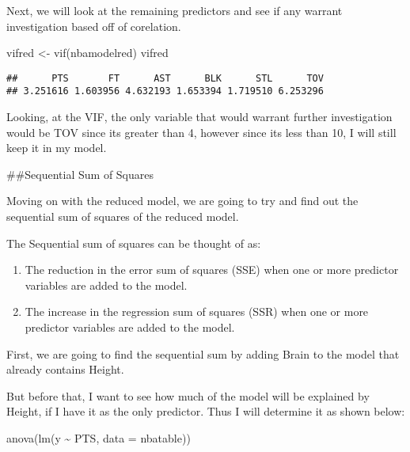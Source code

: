 \documentclass[
]{article}
\newenvironment{Shaded}{\begin{snugshade}}{\end{snugshade}}
\newcommand{\AttributeTok}[1]{\textcolor[rgb]{0.77,0.63,0.00}{#1}}
\newcommand{\FunctionTok}[1]{\textcolor[rgb]{0.00,0.00,0.00}{#1}}
\newcommand{\NormalTok}[1]{#1}
\newcommand{\OtherTok}[1]{\textcolor[rgb]{0.56,0.35,0.01}{#1}}
\newcommand{\SpecialCharTok}[1]{\textcolor[rgb]{0.00,0.00,0.00}{#1}}
\begin{document}
Next, we will look at the remaining predictors and see if any warrant
investigation based off of corelation.

\begin{Shaded}
\begin{Highlighting}[]
\NormalTok{vifred }\OtherTok{\textless{}{-}} \FunctionTok{vif}\NormalTok{(nbamodelred)}
\NormalTok{vifred}
\end{Highlighting}
\end{Shaded}

\begin{verbatim}
##      PTS       FT      AST      BLK      STL      TOV 
## 3.251616 1.603956 4.632193 1.653394 1.719510 6.253296
\end{verbatim}

Looking, at the VIF, the only variable that would warrant further
investigation would be TOV since its greater than 4, however since its
less than 10, I will still keep it in my model.

\#\#Sequential Sum of Squares

Moving on with the reduced model, we are going to try and find out the
sequential sum of squares of the reduced model.

The Sequential sum of squares can be thought of as:

\begin{enumerate}
\def\labelenumi{\roman{enumi})}
\item
  The reduction in the error sum of squares (SSE) when one or more
  predictor variables are added to the model.
\item
  The increase in the regression sum of squares (SSR) when one or more
  predictor variables are added to the model.
\end{enumerate}

First, we are going to find the sequential sum by adding Brain to the
model that already contains Height.

But before that, I want to see how much of the model will be explained
by Height, if I have it as the only predictor. Thus I will determine it
as shown below:

\begin{Shaded}
\begin{Highlighting}[]
\FunctionTok{anova}\NormalTok{(}\FunctionTok{lm}\NormalTok{(y }\SpecialCharTok{\textasciitilde{}}\NormalTok{ PTS, }\AttributeTok{data =}\NormalTok{ nbatable))}
\end{Highlighting}
\end{Shaded}
\end{document}
